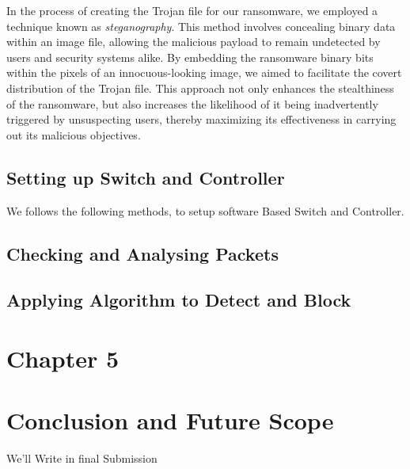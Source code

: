 \documentclass[12pt,letterpaper]{article}
\begin{document}
        In the process of creating the Trojan file for our ransomware, we employed a technique known as \textit{steganography}. This method involves concealing binary data within an image file, allowing the malicious payload to remain undetected by users and security systems alike. By embedding the ransomware binary bits within the pixels of an innocuous-looking image, we aimed to facilitate the covert distribution of the Trojan file. This approach not only enhances the stealthiness of the ransomware, but also increases the likelihood of it being inadvertently triggered by unsuspecting users, thereby maximizing its effectiveness in carrying out its malicious objectives.

        \subsection{Setting up Switch and Controller}

        We follows the following methods, to setup software Based Switch and Controller.

        \subsection{Checking and Analysing Packets}
            \label{Checking and Analysing Packets}




            
        \subsection{Applying Algorithm to Detect and Block}
            \label{Applying Algorithm to Detect and Block}
        
\clearpage
    \newpage
    \section*{Chapter 5}
        \section{Conclusion and Future Scope}

            We'll Write in final Submission

\clearpage
\newpage
{}
    \printbibliography
\end{document}
